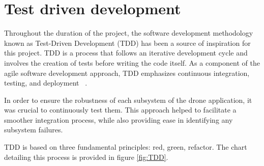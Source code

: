 



\section{Test driven development}
Throughout the duration of the project, the software development methodology known as Test-Driven Development (TDD) has been a source of inspiration for this project. TDD is a process that follows an iterative development cycle and involves the creation of tests before writing the code itself. As a component of the agile software development approach, TDD emphasizes continuous integration, testing, and deployment ~\cite{WhatTestDriven.io}.

In order to ensure the robustness of each subsystem of the drone application, it was crucial to continuously test them. This approach helped to facilitate a smoother integration process, while also providing ease in identifying any subsystem failures.

TDD is based on three fundamental principles: red, green, refactor. The chart detailing this process is provided in figure \ref{fig:TDD}. 
\\

